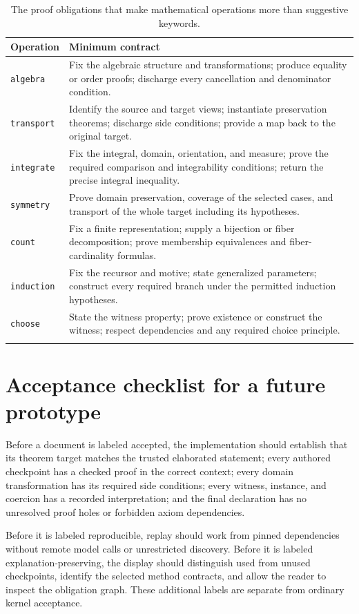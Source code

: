 \documentclass[11pt,a4paper]{article}
\newcommand{\code}[1]{\texttt{\small #1}}
\theoremstyle{definition}
\theoremstyle{remark}
\begin{document}
\begin{longtable}{@{}L{.20\linewidth}L{.72\linewidth}@{}}
\toprule
Operation & Minimum contract\\
\midrule\endhead
\code{algebra} & Fix the algebraic structure and transformations; produce equality or order proofs; discharge every cancellation and denominator condition.\\
\code{transport} & Identify the source and target views; instantiate preservation theorems; discharge side conditions; provide a map back to the original target.\\
\code{integrate} & Fix the integral, domain, orientation, and measure; prove the required comparison and integrability conditions; return the precise integral inequality.\\
\code{symmetry} & Prove domain preservation, coverage of the selected cases, and transport of the whole target including its hypotheses.\\
\code{count} & Fix a finite representation; supply a bijection or fiber decomposition; prove membership equivalences and fiber-cardinality formulas.\\
\code{induction} & Fix the recursor and motive; state generalized parameters; construct every required branch under the permitted induction hypotheses.\\
\code{choose} & State the witness property; prove existence or construct the witness; respect dependencies and any required choice principle.\\
\bottomrule
\caption{The proof obligations that make mathematical operations more than suggestive keywords.}
\end{longtable}

\section{Acceptance checklist for a future prototype}
\label{app:acceptance}
Before a document is labeled accepted, the implementation should establish that its theorem target matches the trusted elaborated statement; every authored checkpoint has a checked proof in the correct context; every domain transformation has its required side conditions; every witness, instance, and coercion has a recorded interpretation; and the final declaration has no unresolved proof holes or forbidden axiom dependencies.

Before it is labeled reproducible, replay should work from pinned dependencies without remote model calls or unrestricted discovery. Before it is labeled explanation-preserving, the display should distinguish used from unused checkpoints, identify the selected method contracts, and allow the reader to inspect the obligation graph. These additional labels are separate from ordinary kernel acceptance.
\end{document}
